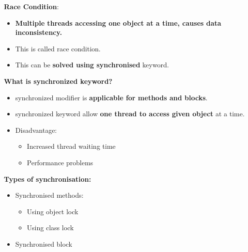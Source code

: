 \setlength{\columnsep}{3pt}
\begin{flushleft}
	
	\textbf{Race Condition}:
	\begin{itemize}
		\item \textbf{Multiple threads accessing one object at a time, causes data inconsistency.}
		\item This is called race condition. 
		\item This can be \textbf{solved using synchronised} keyword.
	\end{itemize}	

	\textbf{What is synchronized keyword?}
	\begin{itemize}
		\item synchronized modifier is \textbf{applicable for methods and blocks}.
		\item synchronized keyword allow \textbf{one thread to access given object} at a time.
		\item Disadvantage:
		\begin{itemize}
			\item Increased thread waiting time
			\item Performance problems
		\end{itemize}
	\end{itemize}

	\textbf{Types of synchronisation:}
	\begin{itemize}
		\item Synchronised methods:
		\begin{itemize}
			\item Using object lock
			\item Using class lock
		\end{itemize}
		\item Synchronised block
	\end{itemize}
	
	
\end{flushleft}

